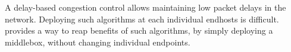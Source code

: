 


 

 A delay-based congestion control allows maintaining low packet delays in the network. Deploying such algorithms at each individual endhosts is difficult. \name provides a way to reap benefits of such algorithms, by simply deploying a middlebox, without changing individual endpoints.
